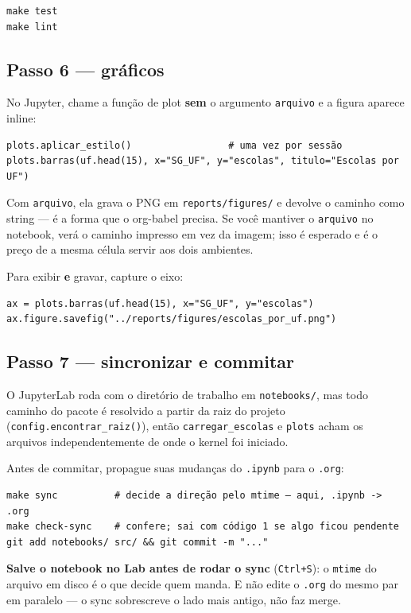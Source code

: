 \documentclass[11pt]{article}
\begin{document}
\begin{verbatim}
make test
make lint
\end{verbatim}
\subsection*{Passo 6 — gráficos}
\label{sec:orgd6f2a18}

No Jupyter, chame a função de plot \textbf{sem} o argumento \texttt{arquivo} e a figura
aparece inline:

\begin{verbatim}
plots.aplicar_estilo()                 # uma vez por sessão
plots.barras(uf.head(15), x="SG_UF", y="escolas", titulo="Escolas por UF")
\end{verbatim}

Com \texttt{arquivo}, ela grava o PNG em \texttt{reports/figures/} e devolve o caminho como
string — é a forma que o org-babel precisa. Se você mantiver o \texttt{arquivo} no
notebook, verá o caminho impresso em vez da imagem; isso é esperado e é o preço
de a mesma célula servir aos dois ambientes.

Para exibir \textbf{e} gravar, capture o eixo:

\begin{verbatim}
ax = plots.barras(uf.head(15), x="SG_UF", y="escolas")
ax.figure.savefig("../reports/figures/escolas_por_uf.png")
\end{verbatim}
\subsection*{Passo 7 — sincronizar e commitar}
\label{sec:orgc38cf17}

O JupyterLab roda com o diretório de trabalho em \texttt{notebooks/}, mas todo caminho
do pacote é resolvido a partir da raiz do projeto (\texttt{config.encontrar\_raiz()}),
então \texttt{carregar\_escolas} e \texttt{plots} acham os arquivos independentemente de onde
o kernel foi iniciado.

Antes de commitar, propague suas mudanças do \texttt{.ipynb} para o \texttt{.org}:

\begin{verbatim}
make sync          # decide a direção pelo mtime — aqui, .ipynb -> .org
make check-sync    # confere; sai com código 1 se algo ficou pendente
git add notebooks/ src/ && git commit -m "..."
\end{verbatim}

\textbf{Salve o notebook no Lab antes de rodar o sync} (\texttt{Ctrl+S}): o \texttt{mtime} do arquivo
em disco é o que decide quem manda. E não edite o \texttt{.org} do mesmo par em
paralelo — o sync sobrescreve o lado mais antigo, não faz merge.
\end{document}
